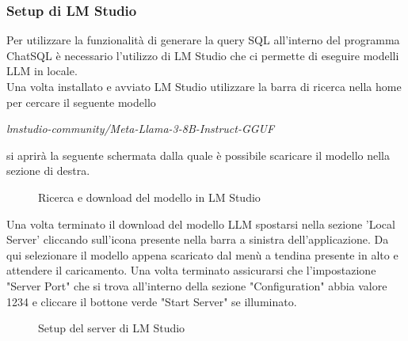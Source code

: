 \documentclass[5pt]{article}
\newlength\myheight
\newlength\mydepth
\newcommand*\inlinegraphics[1]{%
	\settototalheight\myheight{Xygp}%
	\settodepth\mydepth{Xygp}%
	\raisebox{-\mydepth}{\texttt{[image: \#1]}}%
}
\begin{document}
			\subsubsection{Setup di LM Studio}
			Per utilizzare la funzionalità di generare la query SQL all'interno del programma ChatSQL è necessario l'utilizzo di LM Studio che ci permette di eseguire modelli LLM in locale.\\
			Una volta installato e avviato LM Studio utilizzare la barra di ricerca nella home per cercare il seguente modello
			\begin{center}
				\textit{lmstudio-community/Meta-Llama-3-8B-Instruct-GGUF}
			\end{center}
			si aprirà la seguente schermata dalla quale è possibile scaricare il modello nella sezione di destra.
			\begin{figure}[ht]
				\centering
				\caption{Ricerca e download del modello in LM Studio}
			\end{figure}
			Una volta terminato il download del modello LLM spostarsi nella sezione 'Local Server' cliccando sull'icona \inlinegraphics{User_Manual/local_server_icon.png} presente nella barra a sinistra dell'applicazione.
			Da qui selezionare il modello appena scaricato dal menù a tendina presente in alto e attendere il caricamento. Una volta terminato assicurarsi che l'impostazione "Server Port" che si trova all'interno della sezione "Configuration" abbia valore 1234 e cliccare il bottone verde "Start Server" se illuminato.
			\begin{figure}[ht]
				\centering
				\caption{Setup del server di LM Studio}
			\end{figure}
			
\end{document}

